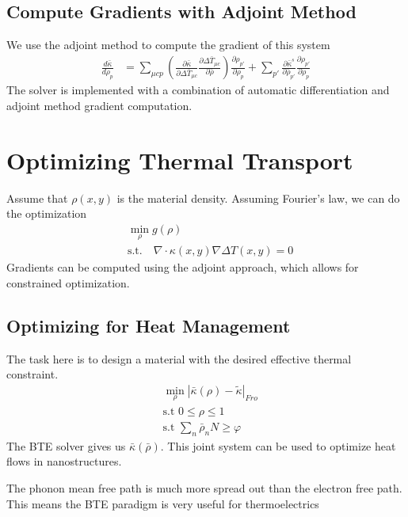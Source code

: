 \documentclass[book.tex]{subfiles}
\begin{document}



\subsection{Compute Gradients with Adjoint Method}

We use the adjoint method to compute the gradient of this system 
\begin{align}
    \frac{d \bar{\kappa}}{d \rho_p} &= \sum_{\mu c p} \left ( \frac{\partial \bar{\kappa}}{\partial \Delta \bar{T}_{\mu c}} \frac{\partial \Delta \bar{T}_{\mu c}}{\partial \bar{\rho}} \right) \frac{\partial \rho_{p'}}{\partial \rho_p} + \sum_{p'} \frac{\partial \bar{\kappa}^s}{\partial \bar{\rho}_{p'}} \frac{\partial \rho_{p'}}{\partial \rho_p}
\end{align}
The solver is implemented with a combination of automatic differentiation and adjoint method gradient computation.

\section{Optimizing Thermal Transport}

Assume that $\rho(x, y)$ is the material density. Assuming Fourier's law, we can do the optimization
\begin{align}
    &\min_\rho g(\rho)\\
    &\textrm{s.t.}\quad \nabla \cdot \kappa(x, y) \nabla \Delta T(x, y) = 0
\end{align}
Gradients can be computed using the adjoint approach, which allows for constrained optimization.

\subsection{Optimizing for Heat Management}

The task here is to design a material with the desired effective thermal constraint.
\begin{align}
    &\min_\rho |\bar{\kappa}(\rho) - \tilde{\kappa} |_{Fro} \\
    &\textrm{s.t } 0 \leq \rho \leq 1 \\
    &\textrm{s.t } \sum_n \bar{\rho}_n N \geq \varphi  
\end{align}
The BTE solver gives us $\bar{\kappa}(\bar{\rho})$. This joint system can be used to optimize heat flows in nanostructures.

The phonon mean free path is much more spread out than the electron free path. This means the BTE paradigm is very useful for thermoelectrics
\end{document}
